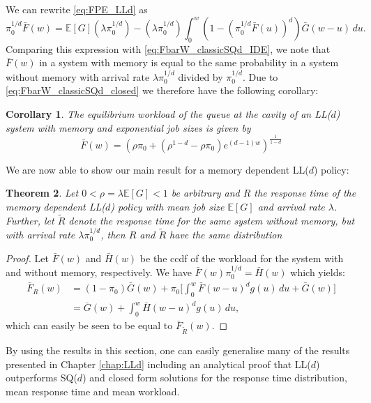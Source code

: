 \documentclass[12pt]{report}
\newcommand{\E}{\mathbb{E}}
\newtheorem{theorem}{Theorem}
\newtheorem{corollary}[theorem]{Corollary}
\begin{document}
We can rewrite \eqref{eq:FPE_LLd} as
$$
\pi_0^{1/d} \bar F(w)
=
\E[G] (\lambda \pi_0^{1/d}) - (\lambda \pi_0^{1/d}) 
\int_0^w (1-(\pi_0^{1/d}\bar F(u))^d) \bar G(w-u) \, du.
$$
Comparing this expression with \eqref{eq:FbarW_classicSQd_IDE}, we note that $\bar F(w)$
in a system with memory is equal to the same probability in a system without memory with
arrival rate $\lambda \pi_0^{1/d}$ divided by $\pi_0^{1/d}$. Due to \eqref{eq:FbarW_classicSQd_closed}
we therefore have the following corollary:

\begin{corollary}
The equilibrium workload of the queue at the cavity of an LL($d$) system with memory and
exponential job sizes is given by 
\begin{equation}
\bar F(w)= (\rho \pi_0 + (\rho^{1-d} - \rho \pi_0) e^{(d-1)w})^{\frac{1}{1-d}} \label{eq:closed_LLd}
\end{equation}
\end{corollary}
We are now able to show our main result for a memory dependent LL($d$) policy:
\begin{theorem} \label{thm:response_LLd}
Let $0 < \rho = \lambda \E[G] < 1$  be arbitrary and $R$ the response time of the memory dependent LL($d$) policy with mean job size $\E[G]$ and arrival rate $\lambda$. Further, let $\tilde R$ denote the response time for the same system without memory, but with arrival rate $\lambda \pi_0^{1/d}$, then $R$ and $\tilde R$ have the same distribution
\end{theorem}
\begin{proof}
Let $\bar F(w)$ and $\bar H(w)$ be the ccdf of the workload for the system with and without
memory, respectively. We have $\bar F(w)\pi_0^{1/d}=\bar H(w)$ which yields:
\begin{align*}
\bar F_{R}(w)
&= (1-\pi_0) \bar G(w) + \pi_0 \bigg[ \int_0^w \bar F(w-u)^d g(u) \, du  + \bar G(w)  \bigg]\\
&= \bar G(w) + \int_0^w \bar H(w-u)^d g(u) \, du,
\end{align*}
which can easily be seen to be equal to $\bar F_{\tilde R}(w)$.
\end{proof}

By using the results in this section, one can easily generalise many of the results presented in Chapter \ref{chap:LLd} including an analytical proof that LL($d$) outperforms SQ($d$) and closed form solutions for the response time distribution, mean response time and mean workload.
\end{document}
